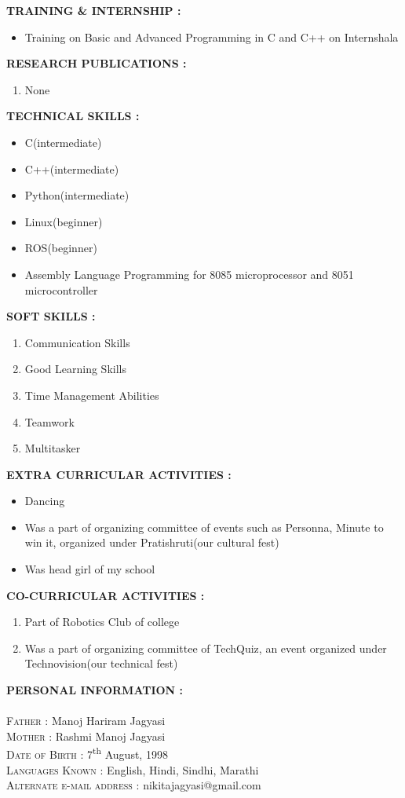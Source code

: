 \documentclass[12pt]{article}
\begin{document}
	\textbf{\textsc{TRAINING \& INTERNSHIP : }}
	\begin{itemize}
		\item Training on Basic and Advanced Programming in C and C++ on Internshala
	\end{itemize}
	\textbf{\textsc{RESEARCH PUBLICATIONS : }}
	\begin{enumerate}
		\item None
	\end{enumerate}
	\textbf{\textsc{TECHNICAL SKILLS : }}
	\begin{itemize}
		\item C(intermediate)
		\item C++(intermediate)
		\item Python(intermediate)
		\item Linux(beginner)
		\item ROS(beginner)
		\item Assembly Language Programming for 8085 microprocessor and 8051 microcontroller
	\end{itemize}
	\textbf{\textsc{SOFT SKILLS : }}
	\begin{enumerate}
		\item Communication Skills
		\item Good Learning Skills
		\item Time Management Abilities
		\item Teamwork
		\item Multitasker
	\end{enumerate}
	\textbf{\textsc{EXTRA CURRICULAR ACTIVITIES : }}
	\begin{itemize}
		\item Dancing
		\item Was a part of organizing committee of events such as Personna, Minute to win it, organized under Pratishruti(our cultural fest)
		\item Was head girl of my school
	\end{itemize}
	\textbf{\textsc{CO-CURRICULAR ACTIVITIES : }}
	\begin{enumerate}
		\item Part of Robotics Club of college
		\item Was a part of organizing committee of TechQuiz, an event organized under Technovision(our technical fest)
	\end{enumerate}
	\textbf{\textsc{PERSONAL INFORMATION : }}\\
	\\
	\textsc{Father : }Manoj Hariram Jagyasi\\
	\textsc{Mother : }Rashmi Manoj Jagyasi\\
	\textsc{Date of Birth : }7\textsuperscript{th} August, 1998\\
	\textsc{Languages Known : }English, Hindi, Sindhi, Marathi\\
	\textsc{Alternate e-mail address : }nikitajagyasi@gmail.com\\
	\\
\end{document}
